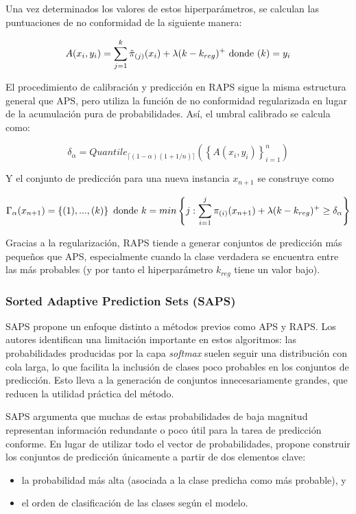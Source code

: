 Una vez determinados los valores de estos hiperparámetros, se calculan las puntuaciones de no conformidad de la siguiente manera:

$$
A(x_i, y_i) = \sum_{j=1}^k \hat{\pi}_{(j)}(x_i) + \lambda (k-k_{reg})^+ \textnormal{ donde } (k) = y_i
$$

El procedimiento de calibración y predicción en RAPS sigue la misma estructura general que APS, pero utiliza la función de no conformidad regularizada en lugar de la acumulación pura de probabilidades. Así, el umbral calibrado se calcula como:

$$
\delta_\alpha = Quantile_{ \lceil  (1-\alpha) (1 + 1/n)  \rceil } \left( \left\{ A(x_i,y_i) \right\}_{i=1}^n \right)
$$

Y el conjunto de predicción para una nueva instancia $x_{n+1}$ se construye como

$$
\Gamma_\alpha(x_{n+1})= \left\{ (1), ..., (k) \right\} \textnormal{ donde } k = min\left\{ j: \sum_{i=1}^{j} \pi_{(i)}(x_{n+1}) + \lambda (k-k_{reg})^+  \ge \delta_\alpha \right\}
$$

Gracias a la regularización, RAPS tiende a generar conjuntos de predicción más pequeños que APS, especialmente cuando la clase verdadera se encuentra entre las más probables (y por tanto el hiperparámetro $k_{reg}$ tiene un valor bajo).


\subsubsection{Sorted Adaptive Prediction Sets (SAPS)}

SAPS \cite{huang2023conformal} propone un enfoque distinto a métodos previos como APS y RAPS. Los autores identifican una limitación importante en estos algoritmos: las probabilidades producidas por la capa \textit{softmax} suelen seguir una distribución con cola larga, lo que facilita la inclusión de clases poco probables en los conjuntos de predicción. Esto lleva a la generación de conjuntos innecesariamente grandes, que reducen la utilidad práctica del método.

SAPS argumenta que muchas de estas probabilidades de baja magnitud representan información redundante o poco útil para la tarea de predicción conforme. En lugar de utilizar todo el vector de probabilidades, propone construir los conjuntos de predicción únicamente a partir de dos elementos clave: 
\begin{itemize}
    \item la probabilidad más alta (asociada a la clase predicha como más probable), y
    \item el orden de clasificación de las clases según el modelo.
\end{itemize}

